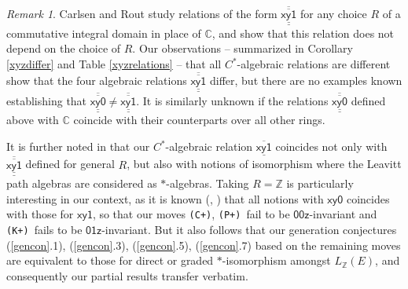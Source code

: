 \documentclass[12pt]{amsbook}%
\theoremstyle{defin}
\theoremstyle{remark}
\newtheorem{remar}[theor]{Remark}
\numberwithin{equation}{chapter}
\numberwithin{theor}{section}
\newcommand{\CC}{\mathbb{C}}
\newcommand{\ZZ}{\mathbb{Z}}
\newcommand{\xyz}[1]{\mbox{$\mathsf{#1}$}}
\newcommand{\xyzrel}[1]{\mbox{$\overline{\underline{\mathsf{ #1}}}$}}
\newcommand{\xyzLPArel}[1]{\mbox{$\overline{\overline{\underline{\underline{\mathsf{ #1}}}}}$}}
\newcommand{\CCCp}{\mbox{\texttt{\textup{(C+)}}}}
\newcommand{\PPPp}{\mbox{\texttt{\textup{(P+)}}}}
\newcommand{\KKKp}{\mbox{\texttt{\textup{(K+)}}}}
\begin{document}
 \begin{remar}
Carlsen and Rout study relations of the form \xyzLPArel{xy1} for any choice $R$ of a commutative integral domain in place of $\CC$, and show that this relation does not depend on the choice of $R$. Our observations --  summarized in Corollary \ref{xyzdiffer} and Table \ref{xyzrelations} -- that all $C^*$-algebraic relations are different show that the four algebraic relations \xyzLPArel{xy1} differ, but there  are no examples known establishing that $\xyzLPArel{xy0}\not=\xyzLPArel{xy1}$. It is similarly unknown if the relations 
 $\xyzLPArel{xy0}$ defined above with $\CC$ coincide with their counterparts over all other rings.
 
  It is further noted in \cite{tmcjr:dpgisa} that our $C^*$-algebraic relation \xyzrel{xy1} coincides not only with \xyzLPArel{xy1} defined for general $R$, but also with notions of isomorphism where the Leavitt path algebras are considered as  $*$-algebras. Taking $R=\ZZ$ is particularly interesting in our context, as it is known (\cite{tmc:lpaz}, \cite{rjapws:csplpaz}) that all notions with \xyz{xy0} coincides with those for \xyz{xy1}, so that our moves \CCCp, \PPPp\ fail to be \xyz{00z}-invariant and  \KKKp\ fails  to be  \xyz{01z}-invariant. But it also follows that our generation conjectures (\ref{gencon}.1), (\ref{gencon}.3), (\ref{gencon}.5), (\ref{gencon}.7) based on the remaining moves are equivalent to those for direct or graded $*$-isomorphism amongst $L_\ZZ(E)$, and consequently our partial results transfer verbatim.
  
  
  
  
  
  \end{remar}
 
\end{document}
